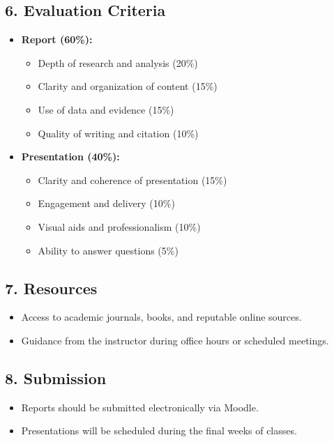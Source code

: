 \documentclass[12pt]{article}
\begin{document}
\subsection*{6. Evaluation Criteria}
\begin{itemize}
    \item \textbf{Report (60\%):}
    \begin{itemize}
        \item Depth of research and analysis (20\%)
        \item Clarity and organization of content (15\%)
        \item Use of data and evidence (15\%)
        \item Quality of writing and citation (10\%)
    \end{itemize}
    \item \textbf{Presentation (40\%):}
    \begin{itemize}
        \item Clarity and coherence of presentation (15\%)
        \item Engagement and delivery (10\%)
        \item Visual aids and professionalism (10\%)
        \item Ability to answer questions (5\%)
    \end{itemize}
\end{itemize}
\newpage
\subsection*{7. Resources}
\begin{itemize}
    \item Access to academic journals, books, and reputable online sources.
    \item Guidance from the instructor during office hours or scheduled meetings.

\end{itemize}

\subsection*{8. Submission}
\begin{itemize}
    \item Reports should be submitted electronically via Moodle.
    \item Presentations will be scheduled during the final weeks of classes.
\end{itemize}
\end{document}
